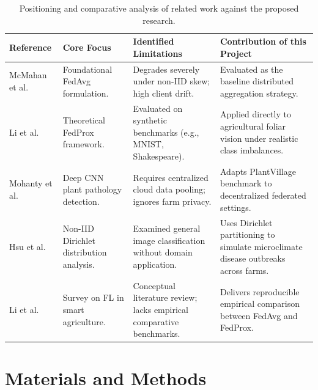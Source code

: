 \documentclass[applsci,article,submit,oneauthor,pdftex]{Definitions/mdpi}
\begin{document}
\begin{table}[H]
\centering
\small
\caption{Positioning and comparative analysis of related work against the proposed research.}
\label{tab:positioning}
\begin{tabularx}{\textwidth}{P{2.5cm} P{2.8cm} P{3.5cm} Q}
\toprule
\textbf{Reference} & \textbf{Core Focus} & \textbf{Identified Limitations} & \textbf{Contribution of this Project} \\
\midrule
McMahan et al.~\cite{mcmahan2017communication} & Foundational FedAvg formulation. & Degrades severely under non-IID skew; high client drift. & Evaluated as the baseline distributed aggregation strategy. \\
Li et al.~\cite{li2020federated} & Theoretical FedProx framework. & Evaluated on synthetic benchmarks (e.g., MNIST, Shakespeare). & Applied directly to agricultural foliar vision under realistic class imbalances. \\
Mohanty et al.~\cite{mohanty2016using} & Deep CNN plant pathology detection. & Requires centralized cloud data pooling; ignores farm privacy. & Adapts PlantVillage benchmark to decentralized federated settings. \\
Hsu et al.~\cite{hsu2019measuring} & Non-IID Dirichlet distribution analysis. & Examined general image classification without domain application. & Uses Dirichlet partitioning to simulate microclimate disease outbreaks across farms. \\
Li et al.~\cite{li2021federated_agri} & Survey on FL in smart agriculture. & Conceptual literature review; lacks empirical comparative benchmarks. & Delivers reproducible empirical comparison between FedAvg and FedProx. \\
\bottomrule
\end{tabularx}
\end{table}

\section{Materials and Methods}
\label{sec:materials_methods}
\end{document}
